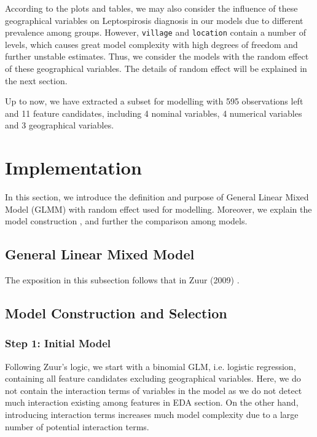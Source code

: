 \documentclass[11pt,twoside]{article}
\numberwithin{Theorem}{section}
\numberwithin{Definition}{section}
\numberwithin{Lemma}{section}
\numberwithin{Algorithm}{section}
\numberwithin{equation}{section}
\begin{document}
According to the plots and tables, we may also consider the influence of these geographical variables on Leptospirosis diagnosis in our models due to different prevalence among groups. However, \texttt{village} and \texttt{location} contain a number of levels, which causes great model complexity with high degrees of freedom and further unstable estimates. Thus, we consider the models with the random effect of these geographical variables. The details of random effect will be explained in the next section.

Up to now, we have extracted a subset for modelling with 595 observations left and 11 feature candidates, including 4 nominal variables, 4 numerical variables and 3 geographical variables.

\clearpage

\section{Implementation}
\label{sec:implementation}

In this section, we introduce the definition and purpose of General Linear Mixed Model (GLMM) with random effect used for modelling. Moreover, we explain the model construction , and further the comparison among models.

\subsection{General Linear Mixed Model}

The exposition in this subsection follows that in Zuur (2009) \cite{zuur2009}.

\subsection{Model Construction and Selection}

\subsubsection{Step 1: Initial Model}

Following Zuur's logic, we start with a binomial GLM, i.e. logistic regression, containing all feature candidates excluding geographical variables. Here, we do not contain the interaction terms of variables in the model as we do not detect much interaction existing among features in EDA section. On the other hand, introducing interaction terms increases much model complexity due to a large number of potential interaction terms. 
\end{document}
